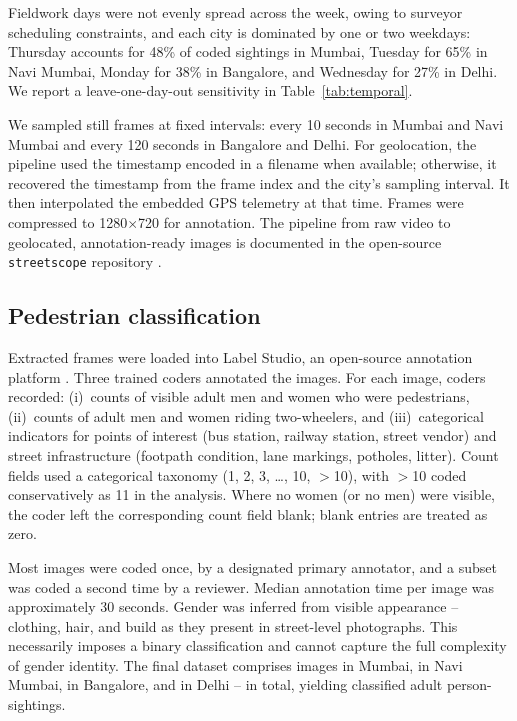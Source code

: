 \documentclass[12pt]{article}
\begin{document}
Fieldwork days were not evenly spread across the week, owing to surveyor scheduling constraints, and each city is dominated by one or two weekdays: Thursday accounts for 48\% of coded sightings in Mumbai, Tuesday for 65\% in Navi Mumbai, Monday for 38\% in Bangalore, and Wednesday for 27\% in Delhi. We report a leave-one-day-out sensitivity in Table~\ref{tab:temporal}.

We sampled still frames at fixed intervals: every 10 seconds in Mumbai and Navi Mumbai and every 120 seconds in Bangalore and Delhi. For geolocation, the pipeline used the timestamp encoded in a filename when available; otherwise, it recovered the timestamp from the frame index and the city's sampling interval. It then interpolated the embedded GPS telemetry at that time. Frames were compressed to 1280$\times$720 for annotation. The pipeline from raw video to geolocated, annotation-ready images is documented in the open-source \texttt{streetscope} repository \citep{streetscope2025}.

\subsection{Pedestrian classification}

Extracted frames were loaded into Label Studio, an open-source annotation platform \citep{label_studio}. Three trained coders annotated the images. For each image, coders recorded: (i)~counts of visible adult men and women who were pedestrians, (ii)~counts of adult men and women riding two-wheelers, and (iii)~categorical indicators for points of interest (bus station, railway station, street vendor) and street infrastructure (footpath condition, lane markings, potholes, litter). Count fields used a categorical taxonomy (1, 2, 3, \ldots, 10, $>$10), with $>$10 coded conservatively as 11 in the analysis. Where no women (or no men) were visible, the coder left the corresponding count field blank; blank entries are treated as zero.

Most images were coded once, by a designated primary annotator, and a subset was coded a second time by a reviewer. Median annotation time per image was approximately 30 seconds. Gender was inferred from visible appearance -- clothing, hair, and build as they present in street-level photographs. This necessarily imposes a binary classification and cannot capture the full complexity of gender identity. The final dataset comprises \MumbaiImages{} images in Mumbai, \NaviMumbaiImages{} in Navi Mumbai, \BangaloreImages{} in Bangalore, and \DelhiImages{} in Delhi -- \TotalImages{} in total, yielding \TotalPersonSightings{} classified adult person-sightings.
\end{document}
